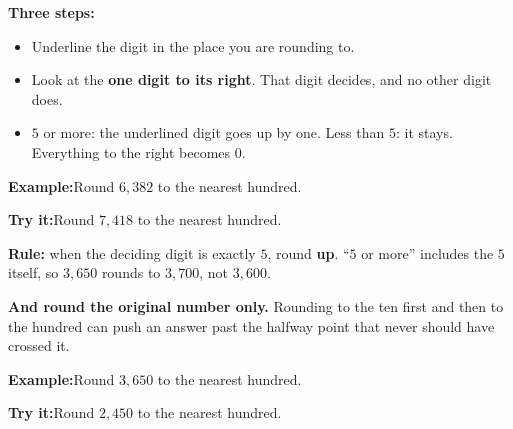 \documentclass[12pt]{article}
\begin{document}

\begin{formulabox}\textbf{Three steps:}\par
\begin{itemize}[leftmargin=1cm, itemsep=1pt, topsep=2pt]
  \item Underline the digit in the place you are rounding to.
  \item Look at the \textbf{one digit to its right}. That digit decides, and no other digit does.
  \item $5$ or more: the underlined digit goes up by one. Less than $5$: it stays. Everything to the right becomes $0$.
\end{itemize}
\end{formulabox}
\begin{examplebox}\textbf{Example:}\quad Round $6{,}382$ to the nearest hundred.
\end{examplebox}
\begin{tryitbox}\textbf{Try it:}\quad Round $7{,}418$ to the nearest hundred.\\[2pt]
\end{tryitbox}

\begin{formulabox}\textbf{Rule:} when the deciding digit is exactly $5$, round
\textbf{up}. ``$5$ or more'' includes the $5$ itself, so $3{,}650$ rounds to $3{,}700$,
not $3{,}600$.\par
\textbf{And round the original number only.} Rounding to the ten first and then to the
hundred can push an answer past the halfway point that never should have crossed it.
\end{formulabox}
\begin{examplebox}\textbf{Example:}\quad Round $3{,}650$ to the nearest hundred.
\end{examplebox}
\begin{tryitbox}\textbf{Try it:}\quad Round $2{,}450$ to the nearest hundred.\\[2pt]
\end{tryitbox}
\end{document}
